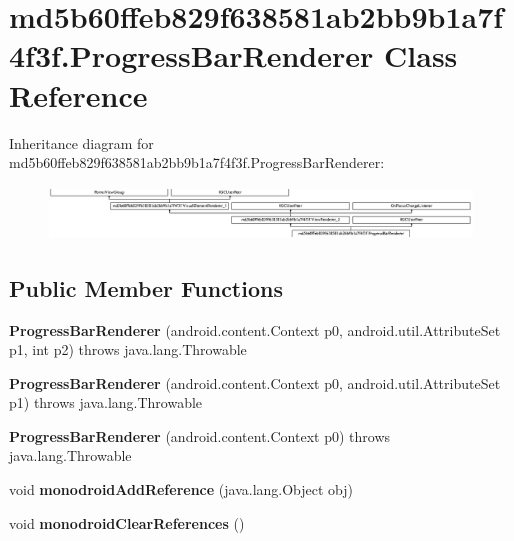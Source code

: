 \hypertarget{classmd5b60ffeb829f638581ab2bb9b1a7f4f3f_1_1ProgressBarRenderer}{}\section{md5b60ffeb829f638581ab2bb9b1a7f4f3f.\+Progress\+Bar\+Renderer Class Reference}
\label{classmd5b60ffeb829f638581ab2bb9b1a7f4f3f_1_1ProgressBarRenderer}
Inheritance diagram for md5b60ffeb829f638581ab2bb9b1a7f4f3f.\+Progress\+Bar\+Renderer\+:\begin{figure}[H]
\begin{center}
\leavevmode
\includegraphics[height=1.403509cm]{classmd5b60ffeb829f638581ab2bb9b1a7f4f3f_1_1ProgressBarRenderer}
\end{center}
\end{figure}
\subsection*{Public Member Functions}
\begin{DoxyCompactItemize}
\item 
\mbox{\label{classmd5b60ffeb829f638581ab2bb9b1a7f4f3f_1_1ProgressBarRenderer_a941a4c014f87f9892f1b14f44446d83e}} 
{\bfseries Progress\+Bar\+Renderer} (android.\+content.\+Context p0, android.\+util.\+Attribute\+Set p1, int p2)  throws java.\+lang.\+Throwable 	
\item 
\mbox{\label{classmd5b60ffeb829f638581ab2bb9b1a7f4f3f_1_1ProgressBarRenderer_a52dcb02f00d412da68b7ca790ffb2956}} 
{\bfseries Progress\+Bar\+Renderer} (android.\+content.\+Context p0, android.\+util.\+Attribute\+Set p1)  throws java.\+lang.\+Throwable 	
\item 
\mbox{\label{classmd5b60ffeb829f638581ab2bb9b1a7f4f3f_1_1ProgressBarRenderer_a376f162b961385dc3a452ce65fe97037}} 
{\bfseries Progress\+Bar\+Renderer} (android.\+content.\+Context p0)  throws java.\+lang.\+Throwable 	
\item 
\mbox{\label{classmd5b60ffeb829f638581ab2bb9b1a7f4f3f_1_1ProgressBarRenderer_a202f5798a458806f96e04ca5e9dffe33}} 
void {\bfseries monodroid\+Add\+Reference} (java.\+lang.\+Object obj)
\item 
\mbox{\label{classmd5b60ffeb829f638581ab2bb9b1a7f4f3f_1_1ProgressBarRenderer_ac94ee2b4c29a46b82c4caf81da54a9bc}} 
void {\bfseries monodroid\+Clear\+References} ()
\end{DoxyCompactItemize}
